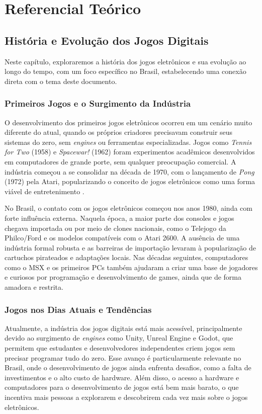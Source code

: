 \chapter{Referencial Teórico}


\section{História e Evolução dos Jogos Digitais}

Neste capítulo, exploraremos a história dos jogos eletrônicos e sua evolução ao longo do tempo, com um foco específico no Brasil, estabelecendo uma conexão direta com o tema deste documento.

\subsection{Primeiros Jogos e o Surgimento da Indústria}

O desenvolvimento dos primeiros jogos eletrônicos ocorreu em um cenário muito diferente do atual, quando os próprios criadores precisavam construir seus sistemas do zero, sem \textit{engines} ou ferramentas especializadas. Jogos como \textit{Tennis for Two} (1958) e \textit{Spacewar!} (1962) foram experimentos acadêmicos desenvolvidos em computadores de grande porte, sem qualquer preocupação comercial. A indústria começou a se consolidar na década de 1970, com o lançamento de \textit{Pong} (1972) pela Atari, popularizando o conceito de jogos eletrônicos como uma forma viável de entretenimento \cite{kent2001}.

No Brasil, o contato com os jogos eletrônicos começou nos anos 1980, ainda com forte influência externa. Naquela época, a maior parte dos consoles e jogos chegava importada ou por meio de clones nacionais, como o Telejogo da Philco/Ford e os modelos compatíveis com o Atari 2600. A ausência de uma indústria formal robusta e as barreiras de importação levaram à popularização de cartuchos pirateados e adaptações locais. Nas décadas seguintes, computadores como o MSX e os primeiros PCs também ajudaram a criar uma base de jogadores e curiosos por programação e desenvolvimento de games, ainda que de forma amadora e restrita. \cite{diniz2024}

\subsection{Jogos nos Dias Atuais e Tendências}

Atualmente, a indústria dos jogos digitais está mais acessível, principalmente devido ao surgimento de \textit{engines} como Unity, Unreal Engine e Godot, que permitem que estudantes e desenvolvedores independentes criem jogos sem precisar programar tudo do zero. Esse avanço é particularmente relevante no Brasil, onde o desenvolvimento de jogos ainda enfrenta desafios, como a falta de investimentos e o alto custo de hardware. Além disso, o acesso a hardware e computadores para o desenvolvimento de jogos está bem mais barato, o que incentiva mais pessoas a explorarem e descobrirem cada vez mais sobre o jogos eletrônicos.

